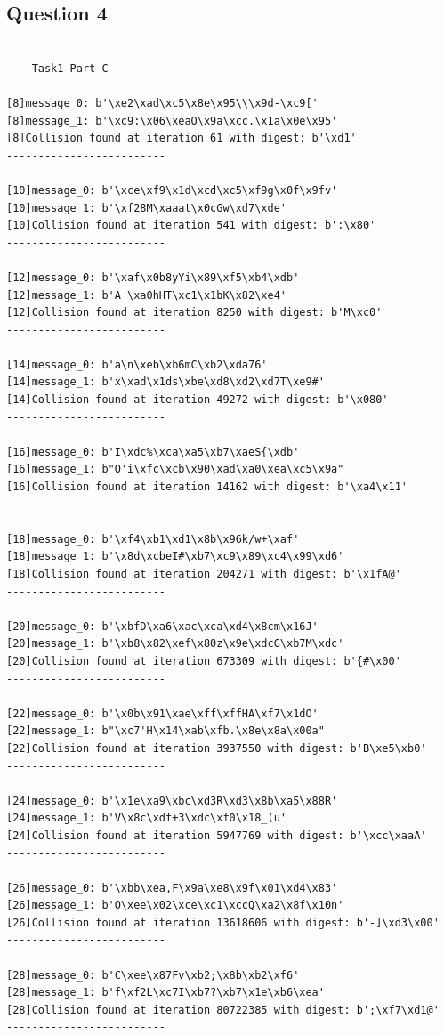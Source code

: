 \documentclass[11pt]{article}
\begin{document}
\subsection*{Question 4}

\begin{lstlisting}

--- Task1 Part C ---

[8]message_0: b'\xe2\xad\xc5\x8e\x95\\\x9d-\xc9['
[8]message_1: b'\xc9:\x06\xeaO\x9a\xcc.\x1a\x0e\x95'
[8]Collision found at iteration 61 with digest: b'\xd1'
-------------------------

[10]message_0: b'\xce\xf9\x1d\xcd\xc5\xf9g\x0f\x9fv'
[10]message_1: b'\xf28M\xaaat\x0cGw\xd7\xde'
[10]Collision found at iteration 541 with digest: b':\x80'
-------------------------

[12]message_0: b'\xaf\x0b8yYi\x89\xf5\xb4\xdb'
[12]message_1: b'A \xa0hHT\xc1\x1bK\x82\xe4'
[12]Collision found at iteration 8250 with digest: b'M\xc0'
-------------------------

[14]message_0: b'a\n\xeb\xb6mC\xb2\xda76'
[14]message_1: b'x\xad\x1ds\xbe\xd8\xd2\xd7T\xe9#'
[14]Collision found at iteration 49272 with digest: b'\x080'
-------------------------

[16]message_0: b'I\xdc%\xca\xa5\xb7\xaeS{\xdb'
[16]message_1: b"O'i\xfc\xcb\x90\xad\xa0\xea\xc5\x9a"
[16]Collision found at iteration 14162 with digest: b'\xa4\x11'
-------------------------

[18]message_0: b'\xf4\xb1\xd1\x8b\x96k/w+\xaf'
[18]message_1: b'\x8d\xcbeI#\xb7\xc9\x89\xc4\x99\xd6'
[18]Collision found at iteration 204271 with digest: b'\x1fA@'
-------------------------

[20]message_0: b'\xbfD\xa6\xac\xca\xd4\x8cm\x16J'
[20]message_1: b'\xb8\x82\xef\x80z\x9e\xdcG\xb7M\xdc'
[20]Collision found at iteration 673309 with digest: b'{#\x00'
-------------------------

[22]message_0: b'\x0b\x91\xae\xff\xffHA\xf7\x1dO'
[22]message_1: b"\xc7'H\x14\xab\xfb.\x8e\x8a\x00a"
[22]Collision found at iteration 3937550 with digest: b'B\xe5\xb0'
-------------------------

[24]message_0: b'\x1e\xa9\xbc\xd3R\xd3\x8b\xa5\x88R'
[24]message_1: b'V\x8c\xdf+3\xdc\xf0\x18_(u'
[24]Collision found at iteration 5947769 with digest: b'\xcc\xaaA'
-------------------------

[26]message_0: b'\xbb\xea,F\x9a\xe8\x9f\x01\xd4\x83'
[26]message_1: b'O\xee\x02\xce\xc1\xccQ\xa2\x8f\x10n'
[26]Collision found at iteration 13618606 with digest: b'-]\xd3\x00'
-------------------------

[28]message_0: b'C\xee\x87Fv\xb2;\x8b\xb2\xf6'
[28]message_1: b'f\xf2L\xc7I\xb7?\xb7\x1e\xb6\xea'
[28]Collision found at iteration 80722385 with digest: b';\xf7\xd1@'
-------------------------
\end{lstlisting}
\end{document}
